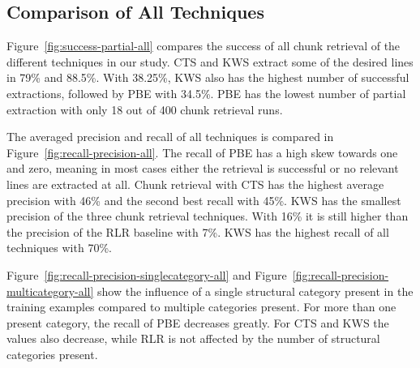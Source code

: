 \documentclass[\myrootdir/main.tex]{subfiles}
\begin{document}
\subsection{Comparison of All Techniques}
Figure~\ref{fig:success-partial-all} compares the success of all chunk retrieval of the different techniques in our study.
CTS and KWS extract some of the desired lines in 79\% and 88.5\%.
With 38.25\%, KWS also has the highest number of successful extractions, followed by PBE with 34.5\%.
PBE has the lowest number of partial extraction with only 18 out of 400 chunk retrieval runs.

The averaged precision and recall of all techniques is compared in Figure~\ref{fig:recall-precision-all}.
The recall of PBE has a high skew towards one and zero, meaning in most cases either the retrieval is successful or no relevant lines are extracted at all.
Chunk retrieval with CTS has the highest average precision with 46\% and the second best recall with 45\%.
KWS has the smallest precision of the three chunk retrieval techniques.
With 16\% it is still higher than the precision of the RLR baseline with 7\%.
KWS has the highest recall of all techniques with 70\%.

Figure~\ref{fig:recall-precision-singlecategory-all} and Figure~\ref{fig:recall-precision-multicategory-all} show the influence of a single structural category present in the training examples compared to multiple categories present.
For more than one present category, the recall of PBE decreases greatly.
For CTS and KWS the values also decrease, while RLR is not affected by the number of structural categories present.
\end{document}

